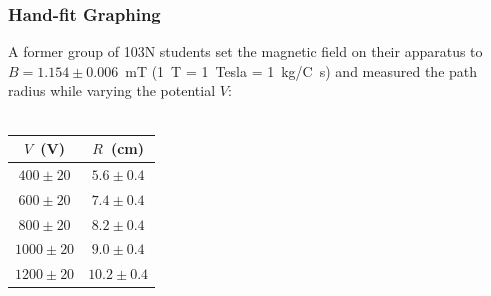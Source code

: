 \subsubsection{Hand-fit Graphing}
\noindent A former group of 103N students set the magnetic field 
on their apparatus to
$B=1.154\pm 0.006$~mT (1~T = 1~Tesla = 1~kg/C~s) and measured the path radius
while varying the potential $V$:\\
\ \\
\begin{center}
\begin{tabular}{|c|c|}
\hline
$V$~(V) & $R$~(cm) \\
\hline %
$400\pm 20$ & $5.6\pm 0.4$ \\
$600\pm 20$ & $7.4\pm 0.4$ \\
$800\pm 20$ & $8.2\pm 0.4$ \\
$1000\pm 20$ & $9.0\pm 0.4$ \\
$1200\pm 20$ & $10.2\pm 0.4$ \\
\hline
\end{tabular}  
\end{center}

